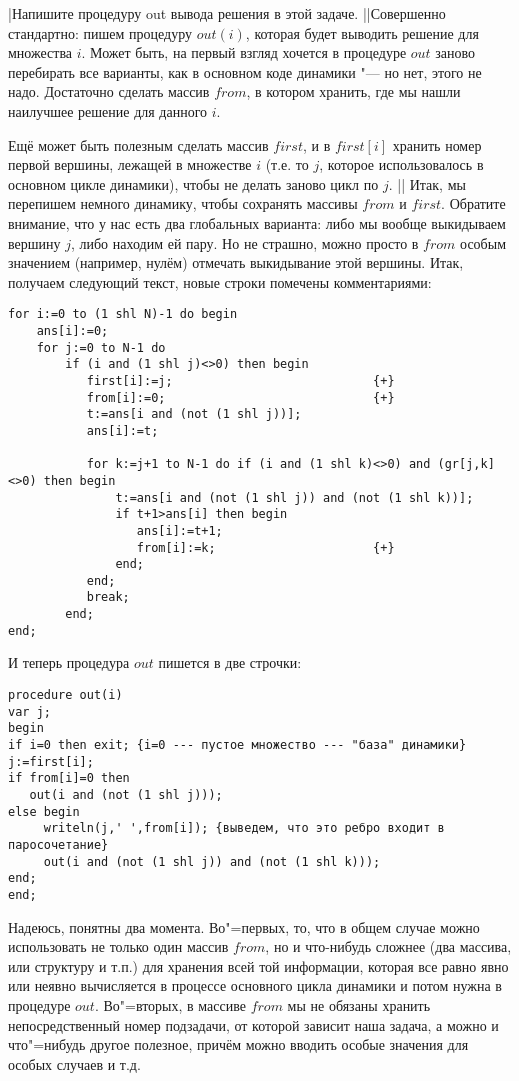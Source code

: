 \task|Напишите процедуру out вывода решения в этой задаче.
||Совершенно стандартно: пишем процедуру $out(i)$, которая будет выводить решение для множества 
$i$. Может быть, на первый взгляд хочется в процедуре $out$ заново перебирать все варианты, как в 
основном коде динамики "--- но нет, этого не надо. Достаточно сделать массив $from$, в котором 
хранить, где мы нашли наилучшее решение для данного $i$. 

Ещё может быть полезным сделать массив $first$, и в $first[i]$ хранить номер первой вершины, 
лежащей в множестве $i$ (т.е. то $j$, которое использовалось в основном цикле динамики), чтобы не 
делать заново цикл по $j$.
||
Итак, мы перепишем немного динамику, чтобы сохранять массивы $from$ и $first$. Обратите внимание, 
что у нас есть два глобальных варианта: либо мы вообще выкидываем вершину $j$, либо находим ей 
пару. Но не страшно, можно просто в $from$ особым значением (например, нулём) отмечать выкидывание 
этой вершины. Итак, получаем следующий текст, новые строки помечены комментариями:
\begin{codesampleo}\begin{verbatim}
for i:=0 to (1 shl N)-1 do begin
    ans[i]:=0;
    for j:=0 to N-1 do 
        if (i and (1 shl j)<>0) then begin 
           first[i]:=j;                            {+}
           from[i]:=0;                             {+}
           t:=ans[i and (not (1 shl j))];  
           ans[i]:=t;     

           for k:=j+1 to N-1 do if (i and (1 shl k)<>0) and (gr[j,k]<>0) then begin 
               t:=ans[i and (not (1 shl j)) and (not (1 shl k))];   
               if t+1>ans[i] then begin
                  ans[i]:=t+1;
                  from[i]:=k;                      {+}
               end;
           end;
           break;
        end;
end;
\end{verbatim}\end{codesampleo}
И теперь процедура $out$ пишется в две строчки:
\begin{codesampleo}\begin{verbatim}
procedure out(i)
var j;
begin
if i=0 then exit; {i=0 --- пустое множество --- "база" динамики}
j:=first[i];
if from[i]=0 then 
   out(i and (not (1 shl j)));
else begin
     writeln(j,' ',from[i]); {выведем, что это ребро входит в паросочетание}
     out(i and (not (1 shl j)) and (not (1 shl k)));
end;
end;
\end{verbatim}\end{codesampleo}

Надеюсь, понятны два момента. Во"=первых, то, что в общем случае можно использовать не только 
один массив $from$, но и что-нибудь сложнее (два массива, или структуру и т.п.) для хранения всей 
той информации, которая все равно явно или неявно вычисляется в процессе основного цикла динамики и 
потом нужна в процедуре $out$. Во"=вторых, в массиве $from$ мы не обязаны хранить непосредственный 
номер подзадачи, от которой зависит наша задача, а можно и что"=нибудь другое полезное, причём 
можно вводить особые значения для особых случаев и т.д.

